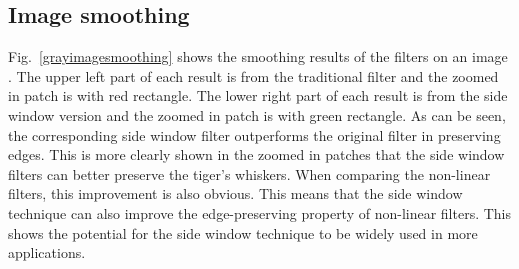 \documentclass[10pt,twocolumn,letterpaper]{article}
\begin{document}
\subsection{Image smoothing}
Fig.~\ref{grayimagesmoothing} shows the smoothing results of the filters on an image \cite{ntire}. The upper left part of each result is from the traditional filter and the zoomed in patch is with red rectangle. The lower right part of each result is from the side window version and the zoomed in patch is with green rectangle. As can be seen, the corresponding side window filter outperforms the original filter in preserving edges. This is more clearly shown in the zoomed in patches that the side window filters can better preserve the tiger's whiskers. When comparing the non-linear filters, this improvement is also obvious. This means that the side window technique can also improve the edge-preserving property of non-linear filters. This shows the potential for the side window technique to be widely used in more applications.
\end{document}
